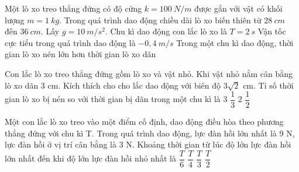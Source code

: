 \begin{ex}%
Một lò xo treo thẳng đứng có độ cứng $k=100 \ N/m$ được gắn với vật có khối lượng $m=1 \ kg$. Trong quá trình dao động chiều dài lò xo biến thiên từ $28 \ cm$ đến $36 \ cm$. Lấy $g=10 \ m/s^2$.
{Chu kì dao động con lắc lò xo là $T=2\ s$}
{\True Vận tốc cực tiểu trong quá trình dao động là $-0,4 \ m/s$}
{Trong một chu kì dao động, thời gian lò xo nén lớn hơn thời gian lò xo dãn}
\end{ex} 
\begin{ex}%
Con lắc lò xo treo thẳng đứng gồm lò xo và vật nhỏ. Khi vật nhỏ nằm cân bằng lò xo dãn 3 cm. Kích thích cho cho lắc dao động với biên độ $3\sqrt{2}$ cm. Tỉ số thời gian lò xo bị nén so với thời gian bị dãn trong một chu kì là
\choice
{3}
{\True $\dfrac{1}{3}$}
{2}
{$\dfrac{1}{2}$}
\end{ex} 
\begin{ex}%
Một con lắc lò xo treo vào một điểm cố định, dao động điều hòa theo phương thẳng đứng với chu kì T. Trong quá trình dao động, lực đàn hồi lớn nhất là 9 N, lực đàn hồi ở vị trí cân bằng là 3 N. Khoảng thời gian từ lúc độ lớn lực đàn hồi lớn nhất đến khi độ lớn lực đàn hồi nhỏ nhất là
\choice
{$ \dfrac{T}{6}$}
{$ \dfrac{T}{4}$}
{\True $ \dfrac{T}{3}$}
{$ \dfrac{T}{2}$}
\end{ex} 
